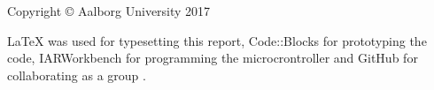\thispagestyle{empty}
{\small
\strut\vfill %
\noindent Copyright \copyright{} Aalborg University 2017\par
\vspace{0.2cm}
\noindent \LaTeX \: was used for typesetting this report,
Code::Blocks for prototyping the code,
IARWorkbench for programming the microcrontroller and
GitHub for collaborating as a group \cite{GitHub}.
}
\clearpage